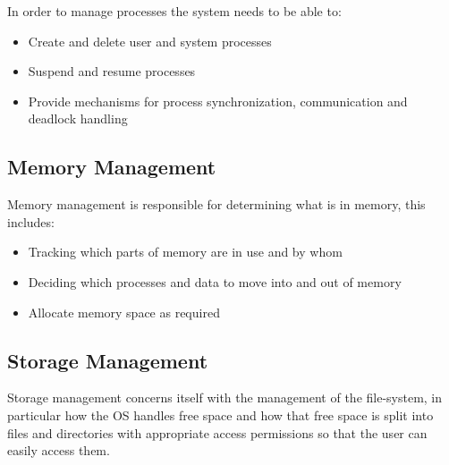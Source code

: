 


	\par{In order to manage processes the system needs to be able to:}

		\begin{itemize}
			\item[]{Create and delete user and system processes}
			\item[]{Suspend and resume processes}
			\item[]{Provide mechanisms for process synchronization, communication and deadlock handling}
		\end{itemize}

\subsection{Memory Management}
	
	\par{Memory management is responsible for determining what is in memory, this includes:}

		\begin{itemize}
			\item[]{Tracking which parts of memory are in use and by whom}
			\item[]{Deciding which processes and data to move into and out of memory}
			\item[]{Allocate memory space as required}
		\end{itemize}

\subsection{Storage Management}

	\par{Storage management concerns itself with the management of the file-system, in particular how the OS handles free space and how that free space is split into files and directories with appropriate access permissions so that the user can easily access them.}



